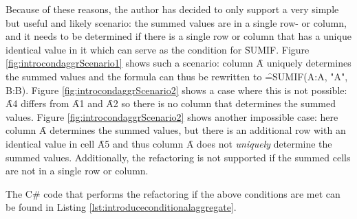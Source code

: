 Because of these reasons, the author has decided to only support a very simple but useful and likely scenario: the summed values are in a single row- or column, and it needs to be determined if there is a single row or column that has a unique identical value in it which can serve as the condition for \f{SUMIF}.
Figure \ref{fig:introcondaggrScenario1} shows such a scenario: column \f{A} uniquely determines the summed values and the formula can thus be rewritten to \f{=SUMIF(A:A, "A", B:B)}.
Figure \ref{fig:introcondaggrScenario2} shows a case where this is not possible: \f{A4} differs from \f{A1} and \f{A2} so there is no column that determines the summed values.
Figure \ref{fig:introcondaggrScenario2} shows another impossible case: here column \f{A} determines the summed values, but there is an additional row with an identical value in cell \f{A5} and thus column \f{A} does not \emph{uniquely} determine the summed values.
Additionally, the refactoring is not supported if the summed cells are not in a single row or column.

The C\# code that performs the refactoring if the above conditions are met can be found in Listing \ref{lst:introduceconditionalaggregate}.

